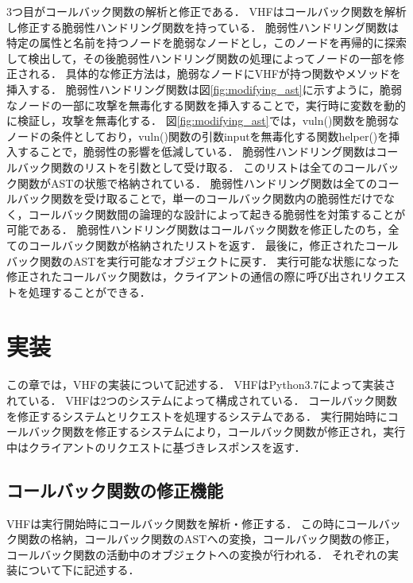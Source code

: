 \documentclass[a4paper,12pt]{jreport}
\begin{document}
3つ目がコールバック関数の解析と修正である．
VHFはコールバック関数を解析し修正する脆弱性ハンドリング関数を持っている．
脆弱性ハンドリング関数は特定の属性と名前を持つノードを脆弱なノードとし，このノードを再帰的に探索して検出して，その後脆弱性ハンドリング関数の処理によってノードの一部を修正される．
具体的な修正方法は，脆弱なノードにVHFが持つ関数やメソッドを挿入する．
脆弱性ハンドリング関数は図\ref{fig:modifying_ast}に示すように，脆弱なノードの一部に攻撃を無毒化する関数を挿入することで，実行時に変数を動的に検証し，攻撃を無毒化する．
図\ref{fig:modifying_ast}では，vuln()関数を脆弱なノードの条件としており，vuln()関数の引数inputを無毒化する関数helper()を挿入することで，脆弱性の影響を低減している．
脆弱性ハンドリング関数はコールバック関数のリストを引数として受け取る．
このリストは全てのコールバック関数がASTの状態で格納されている．
脆弱性ハンドリング関数は全てのコールバック関数を受け取ることで，単一のコールバック関数内の脆弱性だけでなく，コールバック関数間の論理的な設計によって起きる脆弱性を対策することが可能である．
脆弱性ハンドリング関数はコールバック関数を修正したのち，全てのコールバック関数が格納されたリストを返す．
最後に，修正されたコールバック関数のASTを実行可能なオブジェクトに戻す．
実行可能な状態になった修正されたコールバック関数は，クライアントの通信の際に呼び出されリクエストを処理することができる．

\chapter{実装}
この章では，VHFの実装について記述する．
VHFはPython3.7によって実装されている．
VHFは2つのシステムによって構成されている．
コールバック関数を修正するシステムとリクエストを処理するシステムである．
実行開始時にコールバック関数を修正するシステムにより，コールバック関数が修正され，実行中はクライアントのリクエストに基づきレスポンスを返す．

\section{コールバック関数の修正機能}
VHFは実行開始時にコールバック関数を解析・修正する．
この時にコールバック関数の格納，コールバック関数のASTへの変換，コールバック関数の修正，コールバック関数の活動中のオブジェクトへの変換が行われる．
それぞれの実装について下に記述する．
\end{document}
